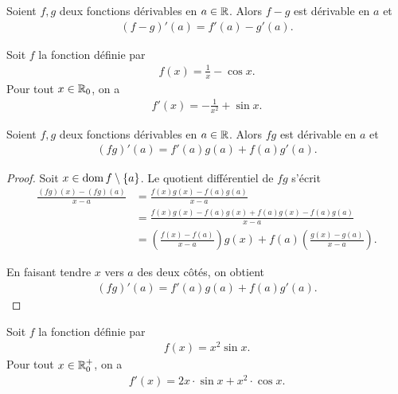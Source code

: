 \documentclass[main.tex]{subfiles}
\begin{document}
\begin{proposition}

    Soient $f, g$ deux fonctions dérivables en $a \in \mathbb{R}$.
    Alors $f - g$ est dérivable en $a$ et
    \begin{align}
        (f - g)'(a) = f'(a) - g'(a).
    \end{align}
\end{proposition}

\begin{example}
    Soit $f$ la fonction définie par 
    \begin{align}
        f(x) = \frac{1}{x} - \cos x.
    \end{align}
    Pour tout $x \in \mathbb{R}_0$, on a 
    \begin{align}
        f'(x) = -\frac{1}{x^2} + \sin x.
    \end{align}
\end{example}

\begin{proposition}

    Soient $f, g$ deux fonctions dérivables en $a \in \mathbb{R}$.
    Alors $f g$ est dérivable en $a$ et
    \begin{align}
        (f g)'(a) = f'(a) g(a) + f(a) g'(a).
    \end{align}
\end{proposition}
\begin{proof}
    Soit $x \in \operatorname{dom} f \setminus \{a\}$.
    Le quotient différentiel de $f g$ s'écrit
    \begin{align}
        \frac {(f g)(x) - (f g)(a)} {x - a}
        &= \frac {f(x) g(x) - f(a) g(a)} {x - a}\\
        &= \frac {f(x) g(x) - f(a) g(x) + f(a) g(x) - f(a) g(a)} {x - a}\\
        &= \left(\frac {f(x) - f(a)} {x - a}\right) g(x) + f(a) \left(\frac {g(x) - g(a)} {x - a}\right).
    \end{align}

    En faisant tendre $x$ vers $a$ des deux côtés,
    on obtient
    \begin{align}
        (f g)'(a) = f'(a) g(a) + f(a) g'(a).
    \end{align}
\end{proof}

\begin{example}
    Soit $f$ la fonction définie par 
    \begin{align}
        f(x) = x^2 \sin x.
    \end{align}
    Pour tout $x \in \mathbb{R}_0^+$, on a 
    \begin{align}
        f'(x) = 2x \cdot \sin x + x^2 \cdot \cos x.
    \end{align}
\end{example}
\end{document}
